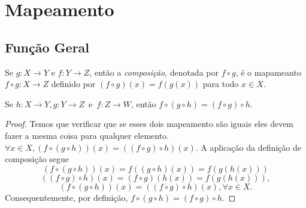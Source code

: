 \section{Mapeamento}
   \subsection{Função Geral}
      \begin{definition}
         Se $g:X \to Y$ e $f:Y \to Z$, então a \emph{composição}, denotada por $f \circ g$, é o mapameanto $f \circ g: X \to Z$ definido por $(f \circ g)(x) = f(g(x))$ para todo $x \in X$.
      \end{definition}
      \begin{lemma}\label{comp-assoc}
      Se $h:X \to Y, g:Y \to Z$\ e\ $f:Z \to W$, então $f\circ (g\circ h) = (f \circ g)\circ h.$
      \begin{proof}
         Temos que verificar que se esses dois mapeamento são iguais eles devem fazer a mesma coisa para qualquer elemento.\\
         $\forall x \in X, (f\circ(g\circ h))(x) = ((f \circ g)\circ h)(x).$ A aplicação da definição de composição segue $$(f\circ (g\circ h))(x)=f((g\circ h)(x))=f(g(h(x)))$$ $$((f\circ g)\circ h)(x)=(f\circ g)(h(x))=f(g(h(x))),$$ $$(f\circ (g \circ h))(x)=((f \circ g)\circ h)(x), \forall x \in X.$$
         Consequentemente, por definição, $f \circ (g \circ h) = (f\circ g) \circ h.$
      \end{proof}
      \end{lemma}

